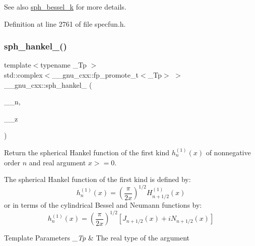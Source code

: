 \begin{DoxySeeAlso}{See also}
\hyperlink{group__gnu__math__spec__func_ga288b28f2c6995d052a4f5f17293cbf1a}{sph\+\_\+bessel\+\_\+k} for more details. 
\end{DoxySeeAlso}


Definition at line 2761 of file specfun.\+h.

\mbox{\label{group__gnu__math__spec__func_ga4424f565fb224ab88b177beb65d08305}} 
\subsubsection{\texorpdfstring{sph\+\_\+hankel\+\_()}{sph\_hankel\_1()}\hspace{0.1cm}{\footnotesize\ttfamily [1/2]}}
{\footnotesize\ttfamily template$<$typename \+\_\+\+Tp $>$ \\
std\+::complex$<$\+\_\+\+\_\+gnu\+\_\+cxx\+::fp\+\_\+promote\+\_\+t$<$\+\_\+\+Tp$>$ $>$ \+\_\+\+\_\+gnu\+\_\+cxx\+::sph\+\_\+hankel\+\_ (\begin{DoxyParamCaption}\item[{unsigned int}]{\+\_\+\+\_\+n,  }\item[{\+\_\+\+Tp}]{\+\_\+\+\_\+z }\end{DoxyParamCaption})\hspace{0.3cm}{\ttfamily [inline]}}

Return the spherical Hankel function of the first kind $ h^{(1)}_n(x) $ of nonnegative order $ n $ and real argument $ x >= 0 $.

The spherical Hankel function of the first kind is defined by\+: \[ h^{(1)}_n(x) = \left(\frac{\pi}{2x} \right) ^{1/2} H^{(1)}_{n+1/2}(x) \] or in terms of the cylindrical Bessel and Neumann functions by\+: \[ h^{(1)}_n(x) = \left(\frac{\pi}{2x} \right) ^{1/2} \left[ J_{n+1/2}(x) + iN_{n+1/2}(x) \right] \]


\begin{DoxyTemplParams}{Template Parameters}
{\em \+\_\+\+Tp} & The real type of the argument \\
\hline
\end{DoxyTemplParams}

